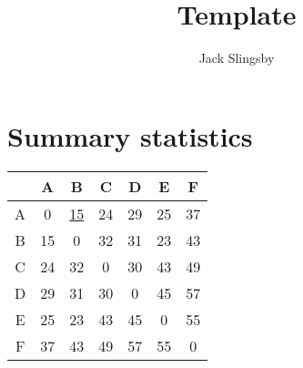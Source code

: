 \documentclass{article}
\title{Template}
\author{Jack Slingsby}
\begin{document}
\maketitle
\pagebreak
\section*{Summary statistics}

\begin{center}
\begin{tabular}{c|c c c c c c}
    
    &A&B&C&D&E&F \\
    \hline
    A&0&\underline{15}&24&29&25&37 \\
    B&15&0&32&31&23&43 \\
    C&24&32&0&30&43&49 \\
    D&29&31&30&0&45&57 \\
    E&25&23&43&45&0&55 \\
    F&37&43&49&57&55&0 \\
    
\end{tabular}
\end{center}
\end{document}
